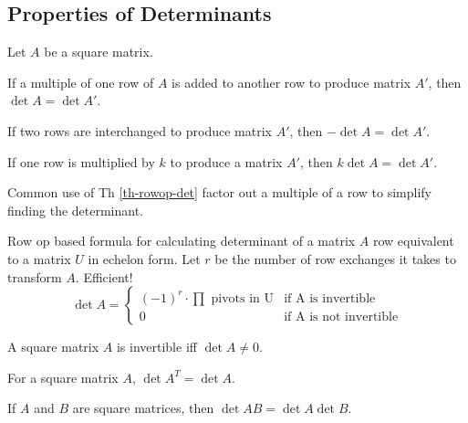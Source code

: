 \begin{card}
    \subsection{Properties of Determinants}

    \begin{theorem}\label{th-rowop-det}
    Let $A$ be a square matrix.

    \begin{compactenum}
    \item If a multiple of one row of $A$ is added to another row to
        produce matrix $A'$, then $\det A = \det A'$.
    \item If two rows are interchanged to produce matrix $A'$, then
        $-\det A = \det A'$.
    \item If one row is multiplied by $k$ to produce a matrix $A'$, then
        $k \det A = \det A'$.
    \end{compactenum}
    \end{theorem}

    \begin{compactdesc}
    \item[Common use of Th \ref{th-rowop-det}] factor out a multiple of
        a row to simplify finding the determinant.
    \item[Row op based formula] for calculating determinant of a matrix $A$
        row equivalent to a matrix $U$ in echelon form.
        Let $r$ be the number of row exchanges it takes to transform $A$.
        Efficient!
        $$\det A = \begin{cases}
            (-1)^r \cdot \prod \text{ pivots in U} & \text{if A is invertible}
         \\ 0 & \text{if A is not invertible}
        \end{cases}$$
    \end{compactdesc}

    \begin{theorem}
        A square matrix $A$ is invertible iff $\det A \neq 0$.
    \end{theorem}

    \begin{theorem}
        For a square matrix $A$, $\det A^T = \det A$.
    \end{theorem}

    \begin{theorem}\label{th-det-prod}
        If $A$ and $B$ are square matrices, then $\det AB = \det A \det B$.
    \end{theorem}


\end{card}
